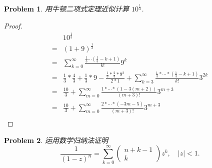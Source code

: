 \documentclass{ctexart}
\newtheorem{problem}{\textbf{Problem}}
\renewcommand{\(}{\left(}
\renewcommand{\)}{\right)}
\begin{document}
\begin{problem}
用牛顿二项式定理近似计算 $10^{\frac{1}{3}}$.
\end{problem}
\begin{proof}
\begin{equation}
\begin{aligned}
&10^{\frac{1}{3}}\\
=&(1+9)^{\frac{1}{3}}\\
=&\sum_{k=0}^{\infty}\frac{\frac{1}{3}\cdots(\frac{1}{3}-k+1)}{k!}9^k\\
=&\frac{1}{3}*\frac{4}{3}+\frac{1}{3}*9-\frac{\frac{1}{3}*\frac{2}{3}*9^2}{2*1}+\sum_{k=3}^{\infty}\frac{\frac{1}{3}*\cdots *(\frac{1}{3}-k+1)}{k!}3^{2k}\\
=&\frac{10}{3}+\sum_{m=0}^{\infty}\frac{1*\cdots *(1-3(m+2))}{(m+3)!}3^{m+3}\\
=&\frac{10}{3}+\sum_{m=0}^{\infty}\frac{2*\cdots *(-3m-5)}{(m+3)!}3^{m+3}\\\iffalse
=&\frac{10}{3}+\sum_{t=0}^{\infty}\frac{1*\cdots *(1-3(2t+2))}{(2t+3)!}3^{2t+3}+\sum_{t=0}^{\infty}\frac{1*\cdots *(1-3(2t+3))}{(2t+4)!}3^{2t+4}\\
=&\frac{10}{3}+\sum_{t=0}^{\infty}\(\frac{1*\cdots *(1-3(2t+2))}{(2t+3)!}3^{2t+3}+\frac{1*\cdots *(1-3(2t+3))}{(2t+4)!}3^{2t+4}\)\\
=&\frac{10}{3}+\sum_{t=0}^{\infty}\(\frac{2*\cdots *(6t+5)}{(2t+3)!}3^{2t+3}-\frac{2*\cdots *(6t+8)}{(2t+4)!}3^{2t+4}\)\\
=&\frac{10}{3}+\sum_{t=0}^{\infty}\frac{2*\cdots *(6t+5)}{(2t+3)!}\(1-\frac{6t+8}{2t+4}*3 \)3^{2t+3}\\
=& \frac{10}{3}-\sum_{t=0}^{\infty}\frac{4*2*\cdots *(6t+5)*(4t+5)}{(2t+4)!}3^{2t+3}\\\fi
\end{aligned}
\end{equation}
\end{proof}
\begin{problem}
运用数学归纳法证明
$$
\frac{1}{(1-z)^n}=\sum_{k=0}^{\infty}\left(\begin{array}{c}
n+k-1 \\
k
\end{array}\right) z^k, \quad|z|<1 .$$
\end{problem}
\end{document}
